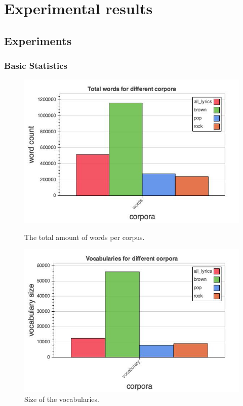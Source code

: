 \documentclass[a4paper,12pt]{article}
\begin{document}
\section{Experimental results}

\subsection{Experiments}

\subsubsection{Basic Statistics}

\begin{figure}[!htb]
\centering
{}
  \centering
  \includegraphics[width=1\linewidth]{word}
  \caption{The total amount of words per corpus.}\label{fig:words}
\endminipage\hfill
{}
  \centering
  \includegraphics[width=1\linewidth]{vocab}
  \caption{Size of the vocabularies.}\label{fig:vocabulary}
\endminipage\hfill
\end{figure}
\end{document}
